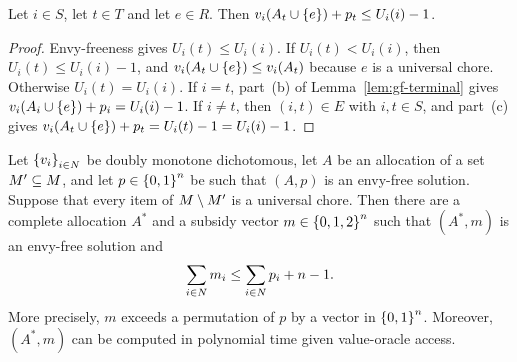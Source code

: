 \begin{lemma}
\label{lem:gf-expensive}
Let $i\in S$, let $t\in T$ and let $e\in R$. Then
$v_i(A_t\cup\left\{e\right\})+p_t\le U_i(i)-1$.
\end{lemma}

\begin{proof}
Envy-freeness gives $U_i(t)\le U_i(i)$. If $U_i(t)<U_i(i)$, then
$U_i(t)\le U_i(i)-1$, and $v_i(A_t\cup\left\{e\right\})\le v_i(A_t)$ because $e$ is a
universal chore. Otherwise $U_i(t)=U_i(i)$. If $i=t$, part~(b) of
Lemma~\ref{lem:gf-terminal} gives $v_i(A_i\cup\left\{e\right\})+p_i=U_i(i)-1$. If $i\ne t$,
then $(i,t)\in E$ with $i,t\in S$, and part~(c) gives
$v_i(A_t\cup\left\{e\right\})+p_t=U_i(t)-1=U_i(i)-1$.
\end{proof}

\begin{lemma}
\label{lem:universal-chores}
Let $\left\{v_i\right\}_{i\in N}$ be doubly monotone dichotomous, let $A$ be an
allocation of a set $M'\subseteq M$, and let $p\in\left\{0,1\right\}^n$ be such that
$(A,p)$ is an envy-free solution. Suppose that every item of
$M\setminus M'$ is a universal chore. Then there are a complete allocation
$A^\ast$ and a subsidy vector $m\in\left\{0,1,2\right\}^n$ such that $(A^\ast,m)$ is an
envy-free solution and
\[
  \sum_{i\in N}m_i\le\sum_{i\in N}p_i+n-1 .
\]
More precisely, $m$ exceeds a permutation of $p$ by a vector in $\left\{0,1\right\}^n$.
Moreover, $(A^\ast,m)$ can be computed in polynomial time given value-oracle
access.
\end{lemma}

